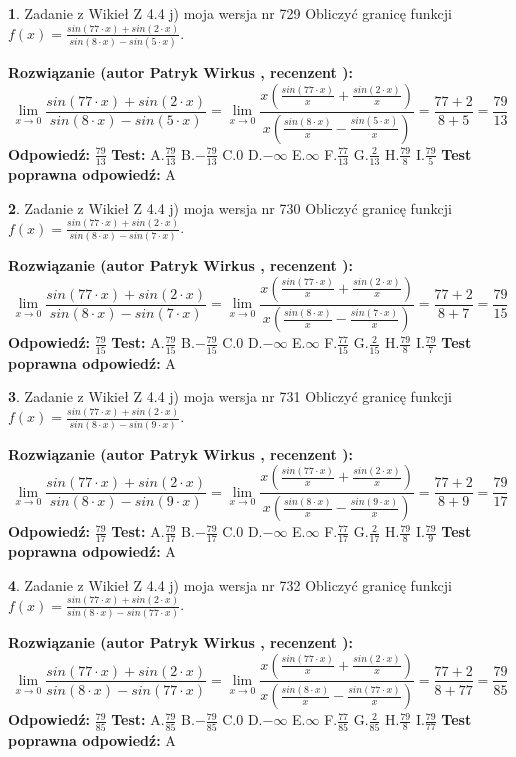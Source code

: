 \documentclass[12pt, a4paper]{article}
\theoremstyle{definition} %
\newtheorem{zad}{}
\newcommand{\zadStart}[1]{\begin{zad}#1\newline}
\newcommand{\zadStop}{\end{zad}}
\newcommand{\rozwStart}[2]{\noindent \textbf{Rozwiązanie (autor #1 , recenzent #2): }\newline}
\newcommand{\rozwStop}{\newline}
\newcommand{\odpStart}{\noindent \textbf{Odpowiedź:}\newline}
\newcommand{\odpStop}{\newline}
\newcommand{\testStart}{\noindent \textbf{Test:}\newline}
\newcommand{\testStop}{\newline}
\newcommand{\kluczStart}{\noindent \textbf{Test poprawna odpowiedź:}\newline}
\newcommand{\kluczStop}{\newline}
\begin{document}
\zadStart{Zadanie z Wikieł Z 4.4 j) moja wersja nr 729}
Obliczyć granicę funkcji $f(x)=\frac{sin(77\cdot x) +sin(2\cdot x)}{sin(8\cdot x) -sin(5\cdot x)}$.
\zadStop
\rozwStart{Patryk Wirkus}{}
$$\lim\limits_{x\to 0}\frac{sin(77\cdot x) +sin(2\cdot x)}{sin(8\cdot x) -sin(5\cdot x)}=\lim\limits_{x\to 0}\frac{x(\frac{sin(77\cdot x)}{x}+\frac{sin(2\cdot x)}{x})}{x(\frac{sin(8\cdot x)}{x}-\frac{sin(5\cdot x)}{x})}=\frac{77+2}{8+5} = \frac{79}{13}$$
\rozwStop
\odpStart
$\frac{79}{13}$
\odpStop
\testStart
A.$\frac{79}{13}$
B.$-\frac{79}{13}$
C.$0$
D.$-\infty$
E.$\infty$
F.$\frac{77}{13}$
G.$\frac{2}{13}$
H.$\frac{79}{8}$
I.$\frac{79}{5}$
\testStop
\kluczStart
A
\kluczStop



\zadStart{Zadanie z Wikieł Z 4.4 j) moja wersja nr 730}
Obliczyć granicę funkcji $f(x)=\frac{sin(77\cdot x) +sin(2\cdot x)}{sin(8\cdot x) -sin(7\cdot x)}$.
\zadStop
\rozwStart{Patryk Wirkus}{}
$$\lim\limits_{x\to 0}\frac{sin(77\cdot x) +sin(2\cdot x)}{sin(8\cdot x) -sin(7\cdot x)}=\lim\limits_{x\to 0}\frac{x(\frac{sin(77\cdot x)}{x}+\frac{sin(2\cdot x)}{x})}{x(\frac{sin(8\cdot x)}{x}-\frac{sin(7\cdot x)}{x})}=\frac{77+2}{8+7} = \frac{79}{15}$$
\rozwStop
\odpStart
$\frac{79}{15}$
\odpStop
\testStart
A.$\frac{79}{15}$
B.$-\frac{79}{15}$
C.$0$
D.$-\infty$
E.$\infty$
F.$\frac{77}{15}$
G.$\frac{2}{15}$
H.$\frac{79}{8}$
I.$\frac{79}{7}$
\testStop
\kluczStart
A
\kluczStop



\zadStart{Zadanie z Wikieł Z 4.4 j) moja wersja nr 731}
Obliczyć granicę funkcji $f(x)=\frac{sin(77\cdot x) +sin(2\cdot x)}{sin(8\cdot x) -sin(9\cdot x)}$.
\zadStop
\rozwStart{Patryk Wirkus}{}
$$\lim\limits_{x\to 0}\frac{sin(77\cdot x) +sin(2\cdot x)}{sin(8\cdot x) -sin(9\cdot x)}=\lim\limits_{x\to 0}\frac{x(\frac{sin(77\cdot x)}{x}+\frac{sin(2\cdot x)}{x})}{x(\frac{sin(8\cdot x)}{x}-\frac{sin(9\cdot x)}{x})}=\frac{77+2}{8+9} = \frac{79}{17}$$
\rozwStop
\odpStart
$\frac{79}{17}$
\odpStop
\testStart
A.$\frac{79}{17}$
B.$-\frac{79}{17}$
C.$0$
D.$-\infty$
E.$\infty$
F.$\frac{77}{17}$
G.$\frac{2}{17}$
H.$\frac{79}{8}$
I.$\frac{79}{9}$
\testStop
\kluczStart
A
\kluczStop



\zadStart{Zadanie z Wikieł Z 4.4 j) moja wersja nr 732}
Obliczyć granicę funkcji $f(x)=\frac{sin(77\cdot x) +sin(2\cdot x)}{sin(8\cdot x) -sin(77\cdot x)}$.
\zadStop
\rozwStart{Patryk Wirkus}{}
$$\lim\limits_{x\to 0}\frac{sin(77\cdot x) +sin(2\cdot x)}{sin(8\cdot x) -sin(77\cdot x)}=\lim\limits_{x\to 0}\frac{x(\frac{sin(77\cdot x)}{x}+\frac{sin(2\cdot x)}{x})}{x(\frac{sin(8\cdot x)}{x}-\frac{sin(77\cdot x)}{x})}=\frac{77+2}{8+77} = \frac{79}{85}$$
\rozwStop
\odpStart
$\frac{79}{85}$
\odpStop
\testStart
A.$\frac{79}{85}$
B.$-\frac{79}{85}$
C.$0$
D.$-\infty$
E.$\infty$
F.$\frac{77}{85}$
G.$\frac{2}{85}$
H.$\frac{79}{8}$
I.$\frac{79}{77}$
\testStop
\kluczStart
A
\kluczStop
\end{document}
